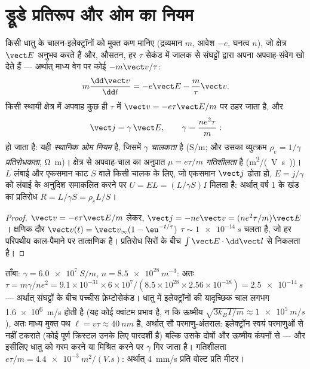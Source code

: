 \section{ड्रूडे प्रतिरूप और ओम का नियम}

\begin{proposition}[ड्रूडे प्रतिरूप; स्थानिक ओम नियम]\label{prop:b2:charges-currents-conduction:drude}
किसी धातु के चालन-इलेक्ट्रॉनों को मुक्त कण मानिए (द्रव्यमान $m$,
आवेश $-e$, घनत्व $n$), जो क्षेत्र $\vect E$ अनुभव करते हैं और, औसतन,
हर $\tau$ सेकंड में जालक से संघट्टों द्वारा अपना अपवाह-संवेग खो देते हैं
--- अर्थात् माध्य वेग पर कोई  $-m\vect v/\tau$:
\[
m\frac{\dd\vect v}{\dd t} = -e\vect E - \frac m\tau\vect v .
\]
किसी स्थायी क्षेत्र में अपवाह कुछ ही $\tau$ में $\vect v = -e\tau
\vect E/m$ पर ठहर जाता है, और 
\[
\vect j = \gamma\,\vect E , \qquad \gamma = \frac{ne^2\tau}{m} :
\]
हो जाता है: यही \emph{स्थानिक ओम नियम} है, जिसमें $\gamma$ \emph{चालकता} है
(\unit{S/m}; और उसका व्युत्क्रम $\rho_e = 1/\gamma$ \emph{प्रतिरोधकता},
\unit{\ohm.m})। क्षेत्र से अपवाह-चाल का अनुपात $\mu = e\tau/m$
\emph{गतिशीलता} है (\unit{m^2/(V.s)})। $L$ लंबाई और
एकसमान काट $S$ वाले किसी चालक के लिए, जो एकसमान $\vect j$ ढोता हो, $E = j/\gamma$ को
लंबाई के अनुदिश समाकलित करने पर $U = EL = (L/\gamma S)I$ मिलता है: अर्थात् वर्ष 1 के खंड का
प्रतिरोध $R = L/\gamma S
= \rho_eL/S$।
\end{proposition}

\begin{proof}
$\vect v = -e\tau\vect E/m$ लेकर, $\vect j = -ne\vect v = (ne^2\tau/m)\vect E$।
क्षणिक दौर $\vect v(t) = \vect v_\infty(1 - \eu^{-t/\tau})$ $\tau \sim
\qty{1e-14}{s}$ चलता है, जो हर परिपथीय काल-पैमाने पर तात्क्षणिक है। प्रतिरोध
सिरों के बीच $\int\vect E\cdot\dd\vect l$ से निकलता है।
\end{proof}

\begin{example}[ताँबा, नापी गई चालकता से]\label{ex:b2:charges-currents-conduction:copper}
ताँबा: $\gamma = \qty{6.0e7}{S/m}$, $n = \qty{8.5e28}{m^{-3}}$: अतः $\tau = m\gamma/ne^2 =
9.1 \times 10^{-31} \times 6 \times 10^7/(8.5 \times 10^{28} \times 2.56 \times 10^{-38}) = \qty{2.5e-14}{s}$
--- अर्थात् संघट्टों के बीच पच्चीस फ़ेम्टोसेकंड। धातु में इलेक्ट्रॉनों की यादृच्छिक
चाल लगभग \qty{1.6e6}{m/s} होती है (यह कोई क्वांटम प्रभाव है, न कि
ऊष्मीय $\sqrt{3k_BT/m} \approx \qty{1e5}{m/s}$), अतः माध्य मुक्त पथ $\ell
= v\tau \approx \qty{40}{nm}$ है, अर्थात् सौ परमाणु-अंतराल: इलेक्ट्रॉन स्वयं
परमाणुओं से नहीं टकराते (कोई पूर्ण क्रिस्टल उनके लिए पारदर्शी है)
बल्कि उसके दोषों और ऊष्मीय कंपनों से --- और इसीलिए
धातु को गरम करने या मिश्रित करने पर $\gamma$ गिर जाता है। गतिशीलता $e\tau/m =
\qty{4.4e-3}{m^2/(V.s)}$: अर्थात् \qty{4}{mm/s} प्रति वोल्ट प्रति मीटर।
\end{example}

